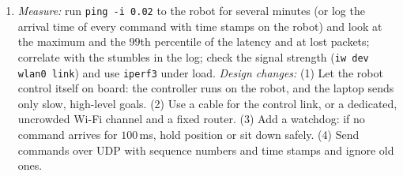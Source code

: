 \begin{enumerate}[label=\textbf{\ansnum.\arabic*}]
\begin{verbatim}
# receive.py (start first)
import socket
s = socket.socket(socket.AF_INET, socket.SOCK_DGRAM)
s.bind(("127.0.0.1", 5005))
data, addr = s.recvfrom(1024)
print(data, addr)
\end{verbatim}
  \item[\textbf{\ansnum.10}] \emph{Measure:} run \texttt{ping -i 0.02} to the robot for several minutes (or log the arrival time of every command with time stamps on the robot) and look at the maximum and the $99$th percentile of the latency and at lost packets; correlate with the stumbles in the log; check the signal strength (\texttt{iw dev wlan0 link}) and use \texttt{iperf3} under load. \emph{Design changes:} (1) Let the robot control itself on board: the controller runs on the robot, and the laptop sends only slow, high-level goals. (2) Use a cable for the control link, or a dedicated, uncrowded Wi-Fi channel and a fixed router. (3) Add a watchdog: if no command arrives for $100$\,ms, hold position or sit down safely. (4) Send commands over UDP with sequence numbers and time stamps and ignore old ones.
\end{enumerate}
